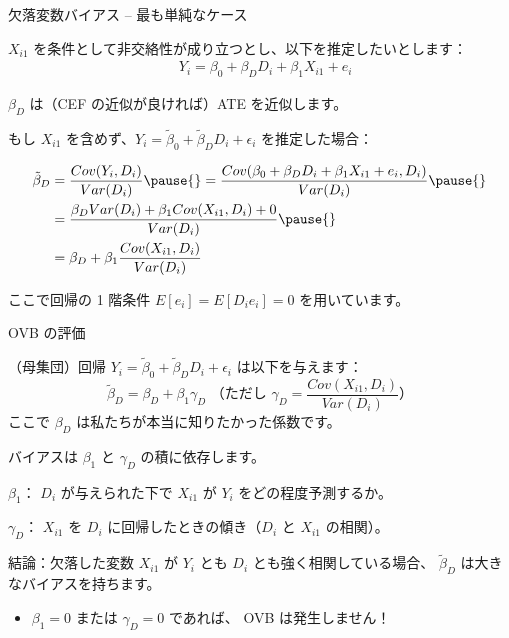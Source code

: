 \documentclass[11pt,handout]{beamer}
\newenvironment{wideitemizeshort}{\itemize}{\enditemize}
\begin{document}
\begin{frame}{欠落変数バイアス -- 最も単純なケース}
\begin{wideitemizeshort}
	\item
	$X_{i1}$ を条件として非交絡性が成り立つとし、以下を推定したいとします：
	{\small \begin{align*}
		& Y_i = \beta_0 + \beta_{D} D_i + \beta_{1} X_{i1}+e_i
	\end{align*} }

	\noindent 
	$\beta_{D}$ は（CEF の近似が良ければ）ATE を近似します。
	
	\item
	もし $X_{i1}$ を含めず、$Y_i = \tilde\beta_0 + \tilde\beta_{D} D_i + \epsilon_i$ を推定した場合：
	
	\pause
	{\small \begin{align*}
		\tilde\beta_D&=\frac{Cov(Y_i,D_i)}{Var(D_i)} \pause{}=\frac{Cov( \beta_0 + \beta_{D} D_i + \beta_{1} X_{i1}+e_i,D_i)}{Var(D_i)} \pause{}\\
&=\frac{\beta_{D}Var(D_i) + \beta_{1} Cov(X_{i1},D_i)+0}{Var(D_i)} \pause{}\\
&=\beta_D+\beta_1\frac{Cov(X_{i1},D_i)}{Var(D_i)}
	\end{align*} }

\noindent ここで回帰の 1 階条件 $E[e_i] = E[D_i e_i] = 0$ を用いています。
\end{wideitemizeshort}	
	
\end{frame}


\begin{frame}{OVB の評価}
	\begin{wideitemizeshort}
		\item
		（母集団）回帰 $Y_i = \tilde\beta_0 + \tilde\beta_D D_i + \epsilon_i$ は以下を与えます：
		$$\tilde{\beta}_D=\beta_D+\beta_1\gamma_D \text{ （ただし } \gamma_D = \frac{Cov(X_{i1},D_i)}{Var(D_i)} \text{）}$$
		\noindent ここで $\beta_D$ は私たちが本当に知りたかった係数です。
				
		\pause
		\item
		バイアスは $\beta_1$ と $\gamma_D$ の積に依存します。
		
		\pause
		\item
		$\beta_1$： $D_i$ が与えられた下で $X_{i1}$ が $Y_i$ をどの程度予測するか。
		
		\pause
		\item
		$\gamma_D$： $X_{i1}$ を $D_i$ に回帰したときの傾き（$D_i$ と $X_{i1}$ の相関）。
		
		\pause
		\item
		結論：欠落した変数 $X_{i1}$ が $Y_i$ とも $D_i$ とも強く相関している場合、 $\tilde\beta_D$ は大きなバイアスを持ちます。 \smallskip\pause{}
		\begin{itemize}
		\item $\beta_1=0$ または $\gamma_D=0$ であれば、 OVB は発生しません！
		\end{itemize}
		
	\end{wideitemizeshort}
	
\end{frame}
\end{document}
